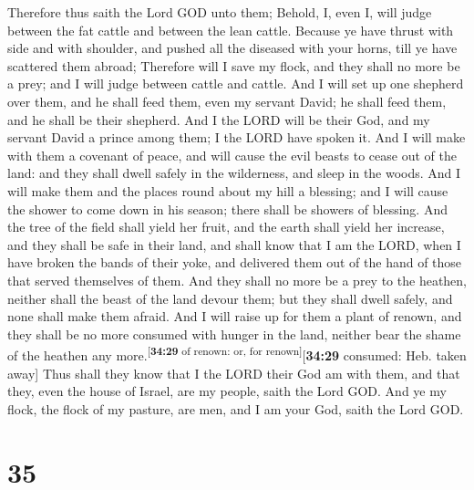  Therefore thus saith the Lord GOD unto them; Behold, I,
even I, will judge between the fat cattle and between the lean cattle.
 Because ye have thrust with side and with shoulder, and
pushed all the diseased with your horns, till ye have scattered them
abroad;  Therefore will I save my flock, and they shall
no more be a prey; and I will judge between cattle and cattle.
 And I will set up one shepherd over them, and he shall
feed them, even my servant David; he shall feed them, and he shall be
their shepherd.  And I the LORD will be their God, and my
servant David a prince among them; I the LORD have spoken it.
 And I will make with them a covenant of peace, and will
cause the evil beasts to cease out of the land: and they shall dwell
safely in the wilderness, and sleep in the woods.  And I
will make them and the places round about my hill a blessing; and I will
cause the shower to come down in his season; there shall be showers of
blessing.  And the tree of the field shall yield her
fruit, and the earth shall yield her increase, and they shall be safe in
their land, and shall know that I am the LORD, when I have broken the
bands of their yoke, and delivered them out of the hand of those that
served themselves of them.  And they shall no more be a
prey to the heathen, neither shall the beast of the land devour them;
but they shall dwell safely, and none shall make them afraid.
 And I will raise up for them a plant of renown, and they
shall be no more consumed with hunger in the land, neither bear the
shame of the heathen any more.\textsuperscript{{[}\textbf{34:29} of
renown: or, for renown{]}}{[}\textbf{34:29} consumed: Heb. taken away{]}
 Thus shall they know that I the LORD their God am with
them, and that they, even the house of Israel, are my people, saith the
Lord GOD.  And ye my flock, the flock of my pasture, are
men, and I am your God, saith the Lord GOD.

\hypertarget{section-34}{%
\section{35}\label{section-34}}

